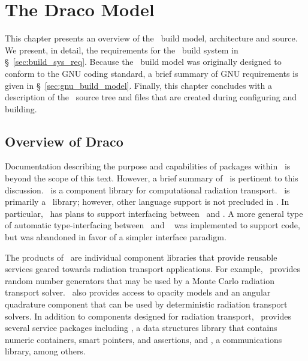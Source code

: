 
\chapter{The Draco Model}
\label{chap:model}

This chapter presents an overview of the \draco\ build model, architecture and
source.  We present, in detail, the requirements for the \draco\ build
system in \S~\ref{sec:build_sys_req}.  Because the \draco\ build model
was originally designed to conform to the GNU coding standard, a brief
summary of GNU requirements is given in \S~\ref{sec:gnu_build_model}.
Finally, this chapter concludes with a description of the \draco\ 
source tree and files that are created during configuring and
building.


\section{Overview of Draco}
\label{sec:overview_of_draco}

Documentation describing the purpose and capabilities of packages
within \draco\ is beyond the scope of this text.  However, a brief
summary of \draco\ is pertinent to this discussion.  \draco\ is a
component library for computational radiation transport.  \draco\ is
primarily a \cpp\ library; however, other language support is not
precluded in \draco.  In particular, \draco\ has plans to support   interfacing between \cpp\ and \fortran {}.  A more general type of 
automatic type-interfacing between \cpp\ and \fortran~\cite{gr99} was implemented to support \sys{Dante} code, but was abandoned in favor of a simpler interface paradigm.

The products of \draco\ are individual component libraries
that provide reusable services geared towards radiation transport
applications.  For example, \draco\ provides random number generators that may be used by a Monte
Carlo radiation transport solver.  \draco\ also provides access to opacity models and an angular quadrature component that can be used by deterministic radiation transport solvers.  In addition to components designed for radiation transport,
\draco\ provides several service packages including \dsxx, a data
structures library that contains numeric containers, smart pointers,
and assertions, and \cfour, a communications library, among others.

